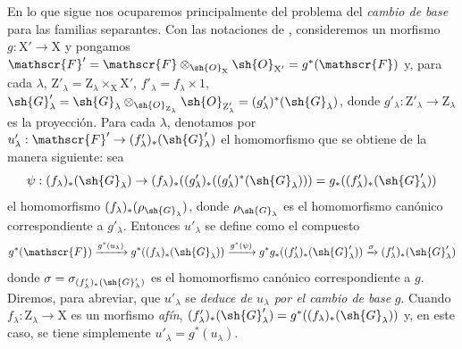 \begin{env}[11.9.5]
\label{IV.11.9.5}
En lo que sigue nos ocuparemos principalmente del problema del \emph{cambio de base} para las familias separantes.
Con las notaciones de , consideremos un morfismo $g:\mathrm{X}'\to\mathrm{X}$ y pongamos $\mathscr{F}'=\mathscr{F}\otimes_{\sh{O}_\mathrm{X}}\sh{O}_{\mathrm{X}'}=g^*(\mathscr{F})$ y, para cada $\lambda$, $\mathrm{Z}'_\lambda=\mathrm{Z}_\lambda\times_\mathrm{X}\mathrm{X}'$, $f'_\lambda=f_\lambda\times 1$, $\sh{G}'_\lambda=\sh{G}_\lambda\otimes_{\sh{O}_{\mathrm{Z}_\lambda}}\sh{O}_{\mathrm{Z}'_\lambda}=(g'_\lambda)^*(\sh{G}_\lambda)$, donde $g'_\lambda:\mathrm{Z}'_\lambda\to\mathrm{Z}_\lambda$ es la proyección.
Para cada $\lambda$, denotamos por $u'_\lambda:\mathscr{F}'\to(f'_\lambda)_*(\sh{G}'_\lambda)$ el homomorfismo que se obtiene de la manera siguiente: sea
\[
  \psi:(f_\lambda)_*(\sh{G}_\lambda)\to(f_\lambda)_*((g'_\lambda)_*((g'_\lambda)^*(\sh{G}_\lambda)))=g_*((f'_\lambda)_*(\sh{G}'_\lambda))
\]
el homomorfismo $(f_\lambda)_*(\rho_{\sh{G}_\lambda})$, donde $\rho_{\sh{G}_\lambda}$ es el homomorfismo canónico  correspondiente a $g'_\lambda$.
Entonces $u'_\lambda$ se define como el compuesto
\[
  g^*(\mathscr{F})\xrightarrow{g^*(u_\lambda)}g^*((f_\lambda)_*(\sh{G}_\lambda))\xrightarrow{g^*(\psi)}g^*g_*((f'_\lambda)_*(\sh{G}'_\lambda))\xrightarrow{\sigma}(f'_\lambda)_*(\sh{G}'_\lambda)
\]
donde $\sigma=\sigma_{(f'_\lambda)_*(\sh{G}'_\lambda)}$ es el homomorfismo canónico  correspondiente a $g$.
Diremos, para abreviar, que $u'_\lambda$ se \emph{deduce de $u_\lambda$ por el cambio de base} $g$.
Cuando $f_\lambda:\mathrm{Z}_\lambda\to\mathrm{X}$ es un morfismo \emph{afín}, $(f'_\lambda)_*(\sh{G}'_\lambda)=g^*((f_\lambda)_*(\sh{G}_\lambda))$ y, en este caso, se tiene simplemente $u'_\lambda=g^*(u_\lambda)$.


\end{env}
